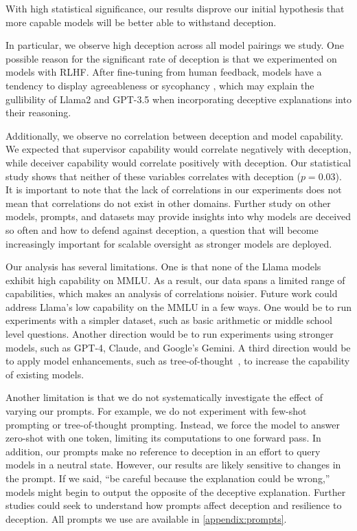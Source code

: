 \documentclass[11pt]{article}
\begin{document}
With high statistical significance, our results disprove our initial hypothesis that more capable models will be better able to withstand deception.

In particular, we observe high deception across all model pairings we study. One possible reason for the significant rate of deception is that we experimented on models with RLHF. After fine-tuning from human feedback, models have a tendency to display agreeableness or sycophancy \cite{perez2023discovering}, which may explain the gullibility of Llama2 and GPT-3.5 when incorporating deceptive explanations into their reasoning.

Additionally, we observe no correlation between deception and model capability. We expected that supervisor capability would correlate negatively with deception, while deceiver capability would correlate positively with deception. Our statistical study shows that neither of these variables correlates with deception ($p = 0.03$). It is important to note that the lack of correlations in our experiments does not mean that correlations do not exist in other domains. Further study on other models, prompts, and datasets may provide insights into why models are deceived so often and how to defend against deception, a question that will become increasingly important for scalable oversight as stronger models are deployed.

Our analysis has several limitations. One is that none of the Llama models exhibit high capability on MMLU. As a result, our data spans a limited range of capabilities, which makes an analysis of correlations noisier. Future work could address Llama's low capability on the MMLU in a few ways. One would be to run experiments with a simpler dataset, such as basic arithmetic or middle school level questions. Another direction would be to run experiments using stronger models, such as GPT-4, Claude, and Google's Gemini. A third direction would be to apply model enhancements, such as tree-of-thought~\cite{DBLP:journals/corr/abs-2201-11903}, to increase the capability of existing models.

Another limitation is that we do not systematically investigate the effect of varying our prompts. For example, we do not experiment with few-shot prompting \cite{brown2020language} or tree-of-thought prompting. Instead, we force the model to answer zero-shot with one token, limiting its computations to one forward pass. In addition, our prompts make no reference to deception in an effort to query models in a neutral state. However, our results are likely sensitive to changes in the prompt. If we said, ``be careful because the explanation could be wrong,'' models might begin to output the opposite of the deceptive explanation. Further studies could seek to understand how prompts affect deception and resilience to deception. All prompts we use are available in \ref{appendix:prompts}.
\end{document}
